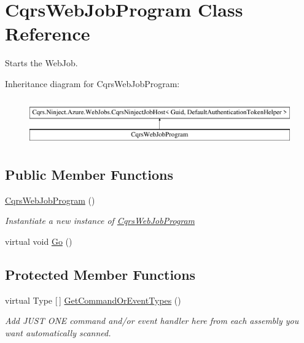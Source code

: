 \hypertarget{classCqrsWebJobProgram}{}\section{Cqrs\+Web\+Job\+Program Class Reference}
\label{classCqrsWebJobProgram}


Starts the Web\+Job.  


Inheritance diagram for Cqrs\+Web\+Job\+Program\+:\begin{figure}[H]
\begin{center}
\leavevmode
\includegraphics[height=2.000000cm]{classCqrsWebJobProgram}
\end{center}
\end{figure}
\subsection*{Public Member Functions}
\begin{DoxyCompactItemize}
\item 
\hyperlink{classCqrsWebJobProgram_aef553539b5ec25d0cdb061fd9895c851_aef553539b5ec25d0cdb061fd9895c851}{Cqrs\+Web\+Job\+Program} ()
\begin{DoxyCompactList}\small\item\em Instantiate a new instance of \hyperlink{classCqrsWebJobProgram}{Cqrs\+Web\+Job\+Program} \end{DoxyCompactList}\item 
virtual void \hyperlink{classCqrsWebJobProgram_a6a4f817351105cb5482ebb7a30c34ebf_a6a4f817351105cb5482ebb7a30c34ebf}{Go} ()
\end{DoxyCompactItemize}
\subsection*{Protected Member Functions}
\begin{DoxyCompactItemize}
\item 
virtual Type \mbox{[}$\,$\mbox{]} \hyperlink{classCqrsWebJobProgram_a2602ec293cadb25dbca9d63be1956818_a2602ec293cadb25dbca9d63be1956818}{Get\+Command\+Or\+Event\+Types} ()
\begin{DoxyCompactList}\small\item\em Add J\+U\+ST O\+NE command and/or event handler here from each assembly you want automatically scanned. \end{DoxyCompactList}\end{DoxyCompactItemize}
